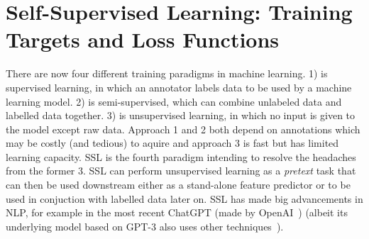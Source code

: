 \documentclass[10pt,twocolumn,letterpaper]{article}
\begin{document}
\section{Self-Supervised Learning: Training Targets and Loss Functions}\label{sec:ssl}

There are now four different training paradigms in machine learning. 1) is supervised learning, in which an annotator labels data to be used by a machine learning model. 2) is semi-supervised, which can combine unlabeled data and labelled data together. 3) is unsupervised learning, in which no input is given to the model except raw data. Approach 1 and 2 both depend on annotations which may be costly (and tedious) to aquire and approach 3 is fast but has limited learning capacity. \gls{SSL} is the fourth paradigm intending to resolve the headaches from the former 3. \gls{SSL} can perform unsupervised learning as a \textit{pretext} task that can then be used downstream either as a stand-alone feature predictor or to be used in conjuction with labelled data later on. \gls{SSL} has made big advancements in \gls{NLP}, for example in the most recent ChatGPT (made by OpenAI~\cite{openAI}) (albeit its underlying model based on GPT-3 also uses other techniques~\cite{gpt3}).
\end{document}
